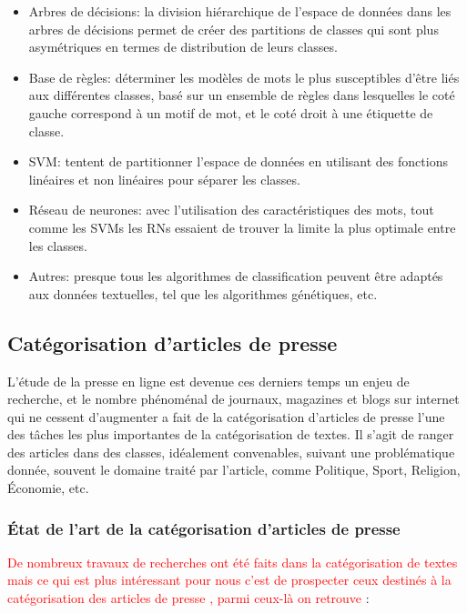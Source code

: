     \begin{itemize}
        \item Arbres de décisions: la division hiérarchique de l'espace de données dans les arbres de décisions permet de créer des partitions de classes qui sont plus asymétriques en termes de distribution de leurs classes.

        \item Base de règles: déterminer les modèles de mots le plus susceptibles d'être liés aux différentes classes, basé sur un ensemble de règles dans lesquelles le coté gauche correspond à un motif de mot, et le coté droit à une étiquette de classe.

        \item SVM: tentent de partitionner l'espace de données en utilisant des fonctions linéaires et non linéaires pour séparer les classes.

        \item Réseau de neurones: avec l'utilisation des caractéristiques des mots, tout comme les SVMs les RNs essaient de trouver la limite la plus optimale entre les classes.

        \item Autres: presque tous les algorithmes de classification peuvent être adaptés aux données textuelles, tel que les algorithmes génétiques, etc.
    \end{itemize}


    \subsection{Catégorisation d'articles de presse}
     L’étude de la presse en ligne est devenue ces derniers temps un enjeu de recherche, et le nombre phénoménal de journaux, magazines et blogs sur internet qui ne cessent d'augmenter a fait de la catégorisation d'articles de presse l'une des tâches les plus importantes de la catégorisation de textes. Il s'agit de ranger des articles dans des classes, idéalement convenables, suivant une problématique donnée, souvent le domaine traité par l'article, comme Politique, Sport, Religion, Économie, etc.

    \subsubsection{État de l'art de la catégorisation d'articles de presse}
    
      \textcolor{red}{De nombreux travaux de recherches ont été faits dans la catégorisation de textes mais ce qui est plus intéressant pour nous c'est de prospecter ceux destinés à la catégorisation des articles de presse \cite{itemetat0}, parmi ceux-là on retrouve} :
     

